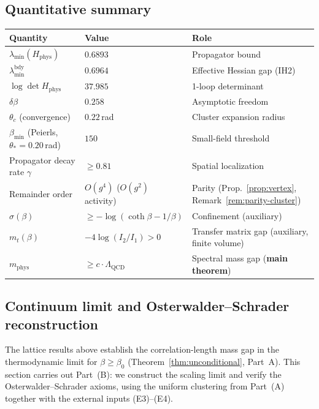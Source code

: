 \documentclass[11pt]{article}
\theoremstyle{definition}
\newcommand{\Lam}{\Lambda_{\mathrm{QCD}}}
\begin{document}
\subsection{Quantitative summary}

\begin{center}
\begin{tabular}{lll}
\toprule
\textbf{Quantity} & \textbf{Value} & \textbf{Role}\\
\midrule
$\lambda_{\min}(H_{\mathrm{phys}})$ & $0.6893$ & Propagator bound\\
$\lambda_{\min}^{\mathrm{bdy}}$ & $0.6964$ & Effective Hessian gap (IH2)\\
$\log\det H_{\mathrm{phys}}$ & $37.985$ & 1-loop determinant\\
$\delta\beta$ & $0.258$ & Asymptotic freedom\\
$\theta_c$ (convergence) & $0.22$\,rad & Cluster expansion radius\\
$\beta_{\min}$ (Peierls, $\theta_*{=}0.20$\,rad) & $150$ &
Small-field threshold\\
Propagator decay rate $\gamma$ & $\ge 0.81$ & Spatial localization\\
Remainder order & $O(g^4)$ ($O(g^2)$ activity) & Parity (Prop.~\ref{prop:vertex},
Remark~\ref{rem:parity-cluster})\\
$\sigma(\beta)$ & $\ge-\log(\coth\beta-1/\beta)$ &
Confinement (auxiliary)\\
$m_t(\beta)$ & $-4\log(I_2/I_1)>0$ & Transfer matrix gap
(auxiliary, finite volume)\\
$m_{\mathrm{phys}}$ & $\ge c\cdot\Lam$ &
Spectral mass gap (\textbf{main theorem})\\
\bottomrule
\end{tabular}
\end{center}

\subsection{Continuum limit and Osterwalder--Schrader reconstruction}%
\label{sec:ost}

The lattice results above establish the correlation-length mass gap
in the thermodynamic limit for $\beta\ge\beta_0$
(Theorem~\ref{thm:unconditional}, Part~A).  This section
carries out Part~(B): we construct the scaling limit and verify
the Osterwalder--Schrader axioms, using the uniform clustering
from Part~(A) together with the external inputs (E3)--(E4).
\end{document}
